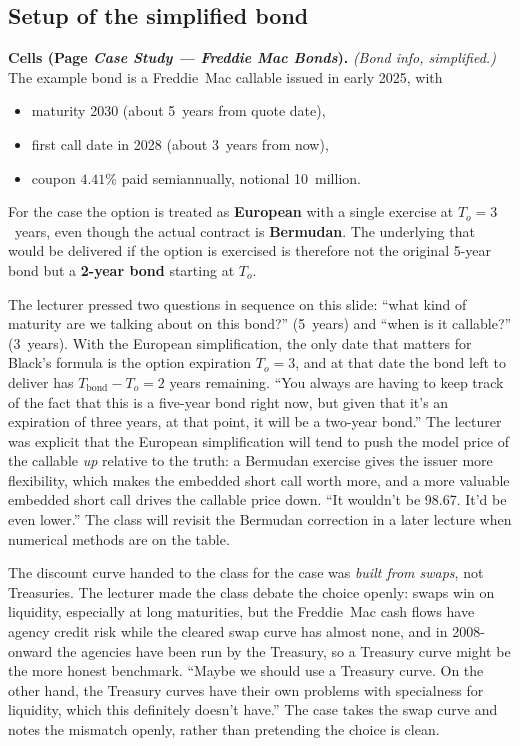 \subsection{Setup of the simplified bond}\label{L6-sec:freddie-setup}

\begin{keyblock}
\textbf{Cells (Page \emph{Case Study --- Freddie Mac Bonds}).}
\emph{(Bond info, simplified.)}\\
The example bond is a Freddie~Mac callable issued in early 2025, with
\begin{itemize}
  \item maturity 2030 (about 5~years from quote date),
  \item first call date in 2028 (about 3~years from now),
  \item coupon $4.41\%$ paid semiannually, notional 10~million.
\end{itemize}
For the case the option is treated as \textbf{European} with a single
exercise at $T_o = 3$~years, even though the actual contract is
\textbf{Bermudan}. The underlying that would be delivered if the
option is exercised is therefore not the original 5-year bond but a
\textbf{2-year bond} starting at $T_o$.
\end{keyblock}

The lecturer pressed two questions in sequence on this slide: ``what
kind of maturity are we talking about on this bond?'' (5~years) and
``when is it callable?'' (3~years). With the European simplification,
the only date that matters for Black's formula is the option
expiration $T_o = 3$, and at that date the bond left to deliver has
$T_{\text{bond}} - T_o = 2$ years remaining. ``You always are having
to keep track of the fact that this is a five-year bond right now,
but given that it's an expiration of three years, at that point, it
will be a two-year bond.'' The lecturer was explicit that the
European simplification will tend to push the model price of the
callable \emph{up} relative to the truth: a Bermudan exercise gives
the issuer more flexibility, which makes the embedded short call
worth more, and a more valuable embedded short call drives the
callable price down. ``It wouldn't be 98.67. It'd be even lower.''
The class will revisit the Bermudan correction in a later lecture
when numerical methods are on the table.

The discount curve handed to the class for the case was \emph{built
from swaps}, not Treasuries. The lecturer made the class debate the
choice openly: swaps win on liquidity, especially at long maturities,
but the Freddie~Mac cash flows have agency credit risk while the
cleared swap curve has almost none, and in 2008-onward the agencies
have been run by the Treasury, so a Treasury curve might be the more
honest benchmark. ``Maybe we should use a Treasury curve. On the
other hand, the Treasury curves have their own problems with
specialness for liquidity, which this definitely doesn't have.''
The case takes the swap curve and notes the mismatch openly, rather
than pretending the choice is clean.

